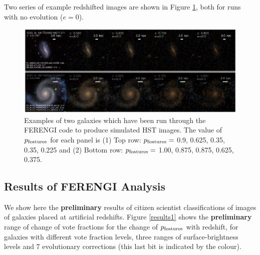 \documentclass[usenatbib]{mn2e}
\begin{document}
Two series of example redshifted images are shown in Figure \ref{exampleFERENGI}, both for runs with no evolution ($e=0$). 

\begin{figure}
\includegraphics[width=160mm]{example_ferengi.ps}
\caption{Examples of two galaxies which have been run through the FERENGI code to produce simulated HST images. The value of $p_{\rm features}$ for each panel is (1) Top row: $p_{\rm features}=$ 0.9, 0.625, 0.35, 0.35, 0.225 and (2) Bottom row: $p_{\rm features}=$ 1.00, 0.875, 0.875, 0.625, 0.375. \label{exampleFERENGI}}
\end{figure}

 

\subsection{Results of FERENGI Analysis}

We show here the {\bf preliminary} results of citizen scientist classifications of images of galaxies placed at artificial redshifts. Figure \ref{results1} shows the {\bf preliminary} range of change of vote fractions for the change of $p_{\rm features}$ with redshift, for galaxies with different vote fraction levels, three ranges of surface-brightness levels and 7 evolutionary corrections (this last bit is indicated by the colour). 
\end{document}
